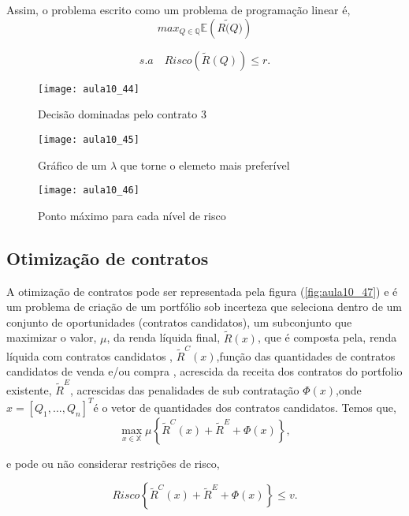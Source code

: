 Assim, o problema escrito como um problema de programação linear é,
$$max_{Q\in\mathbb{Q}}\mathbb{E}\left(\tilde{R(Q})\right)$$

$$s.a \quad Risco\left(\tilde{R}(Q)\right)\leq r.$$

\begin{figure}[H]
\begin{centering}
\texttt{[image: aula10\_44]}\protect\caption{\label{fig:aula10_44} Decisão dominadas pelo contrato 3}
\end{centering}
\end{figure}

\begin{figure}[H]
\begin{centering}
\texttt{[image: aula10\_45]}\protect\caption{\label{fig:aula10_45} Gráfico de um $\lambda$ que torne o elemeto mais preferível}
\end{centering}
\end{figure}

\begin{figure}[H]
\begin{centering}
\texttt{[image: aula10\_46]}\protect\caption{\label{fig:aula10_46} Ponto máximo para cada nível de risco}
\end{centering}
\end{figure}
\subsection{Otimização de contratos}
 A otimização de contratos pode ser representada pela figura (\ref{fig:aula10_47}) e é um problema de criação de um portfólio sob incerteza que seleciona dentro de um conjunto de oportunidades (contratos candidatos), um subconjunto que maximizar o valor, $\mu$, da renda
líquida final, $\tilde{R}(x)$, que é composta pela, renda líquida com contratos candidatos , $\tilde{R}^{C}(x)$,função das quantidades de contratos candidatos de venda e/ou compra , acrescida da receita dos contratos do portfolio existente, $\tilde{R}^{E}$, acrescidas das penalidades de sub contratação $\varPhi(x)$,onde $x=\left[Q_{1},...,Q_{n}\right]^{T}$é o vetor de quantidades dos contratos candidatos.
Temos que,
\[
\max_{x\in\mathbb{X}}\mu\left\{ \tilde{R}^{C}(x)+\tilde{R}^{E}+\varPhi(x)\right\} ,
\]


e pode ou não considerar restrições de risco,

\[
Risco\left\{ \tilde{R}^{C}(x)+\tilde{R}^{E}+\varPhi(x)\right\} \leq v .
\]

